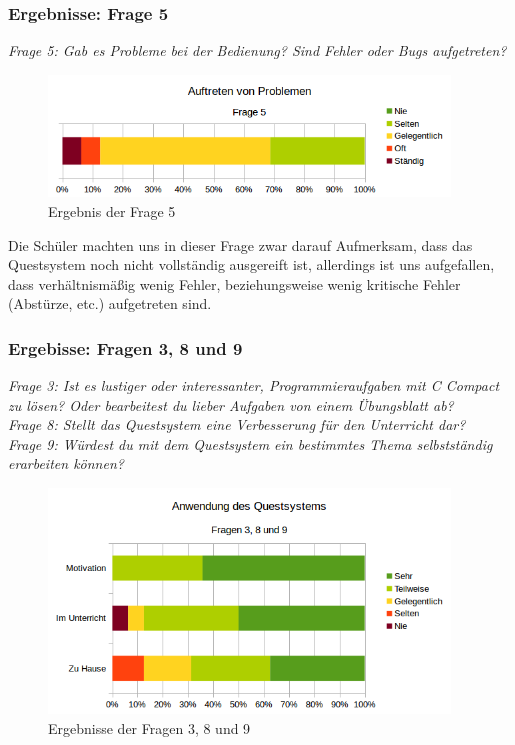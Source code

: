 \subsubsection*{Ergebnisse: Frage 5}

\emph{Frage 5: Gab es Probleme bei der Bedienung? Sind Fehler oder Bugs aufgetreten?}

\begin{figure}[h!]
\centering
\includegraphics[width=0.95\textwidth]{./media/images/gui/trials/quest-f5.png}
\caption{Ergebnis der Frage 5}
\end{figure}

Die Schüler machten uns in dieser Frage zwar darauf Aufmerksam, dass das Questsystem noch nicht vollständig ausgereift ist, allerdings ist uns aufgefallen, dass verhältnismäßig wenig Fehler, beziehungsweise wenig kritische Fehler (Abstürze, etc.) aufgetreten sind.

\subsubsection*{Ergebisse: Fragen 3, 8 und 9}

\emph{Frage 3: Ist es lustiger oder interessanter, Programmieraufgaben mit C Compact zu lösen?
Oder bearbeitest du lieber Aufgaben von einem Übungsblatt ab? \\
Frage 8: Stellt das Questsystem eine Verbesserung für den Unterricht dar? \\
Frage 9: Würdest du mit dem Questsystem ein bestimmtes Thema selbstständig erarbeiten können?}

\begin{figure}[h!]
\centering
\includegraphics[width=0.95\textwidth]{./media/images/gui/trials/quest-f3-8-9.png}
\caption{Ergebnisse der Fragen 3, 8 und 9}
\label{fig:sci-quest-f3-8-9}
\end{figure}

